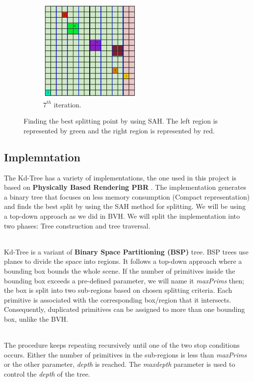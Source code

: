 \documentclass[11pt,a4paper]{article}
\begin{document}
\begin{figure}[H]
\begin{subfigure}[b]{0.475\textwidth}
         \centering
         \includegraphics[width=5cm]{images/kdtree/grid_8.png}
         \caption{$7^{th} $ iteration.}
         \label{fig:pi_18000}
     \end{subfigure}
        \captionsetup{justification=centering,margin=2cm}
        \caption{Finding the best splitting point by using SAH. The left region is represented by green and the right region is represented by red.}
        \label{fig:sahdemo}
\end{figure}


\subsection{Implemntation}
The Kd-Tree has a variety of implementations, the one used in this project is based on \textbf{Physically Based Rendering PBR} \protect\cite{Pharr2016}. The implementation generates a binary tree that focuses on less memory consumption (Compact representation) and finds the best split by using the SAH method for splitting. We will be using a top-down approach as we did in BVH. We will split the implementation into two phases: Tree construction and tree traversal.

\noindent
\\
Kd-Tree is a variant of \textbf{Binary Space Partitioning (BSP)} tree. BSP trees use planes to divide the space into regions. It follows a top-down approach where a bounding box bounds the whole scene. If the number of primitives inside the bounding box exceeds a pre-defined parameter, we will name it \textit{maxPrims} then; the box is split into two sub-regions based on chosen splitting criteria. Each primitive is associated with the corresponding box/region that it intersects. Consequently, duplicated primitives can be assigned to more than one bounding box, unlike the BVH.

\noindent
\\
The procedure keeps repeating recursively until one of the two stop conditions occurs. Either the number of primitives in the sub-regions is less than \textit{maxPrims} or the other parameter, \textit{depth} is reached. The \textit{maxdepth} parameter is used to control the \textit{depth} of the tree.  
\end{document}
